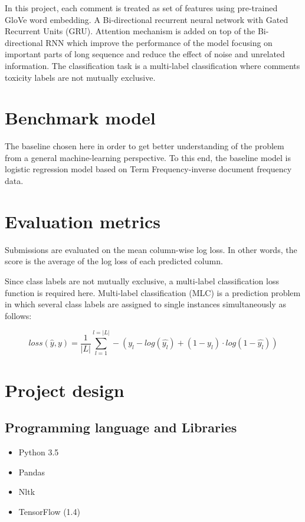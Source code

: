 \documentclass{article}
\begin{document}
In this project, each comment is treated as set of features using pre-trained GloVe word embedding. A Bi-directional recurrent neural network with Gated Recurrent Units (GRU). Attention mechanism is added on top of the Bi-directional RNN which improve the performance of the model focusing on important parts of long sequence and reduce the effect of noise and unrelated information. The classification task is a multi-label classification where comments toxicity labels are not mutually exclusive.


\section{Benchmark model}

The baseline chosen here in order to get better understanding of the problem from a general machine-learning perspective. To this end, the baseline model is logistic regression model based on Term Frequency-inverse document frequency data. 

\section{Evaluation metrics}

Submissions are evaluated on the mean column-wise log loss. In other words, the score is the average of the log loss of each predicted column.


Since class labels are not mutually exclusive, a multi-label classification loss function is required here. Multi-label classification (MLC) is a prediction problem in which several class labels are assigned to single instances simultaneously as follows:

\begin{equation}
        loss(\hat{y}, y) = \frac{1}{|L|} \sum_{l=1}^{l=|L|} - (y_l - log(\hat{y_l}) + (1-y_l) \cdot log(1-\hat{y_l}))
\end{equation}


\section{Project design}

\subsection{Programming language and Libraries}

\begin{itemize}
        \item Python 3.5
        \item Pandas
        \item Nltk
        \item TensorFlow (1.4)
\end{itemize}
\end{document}
